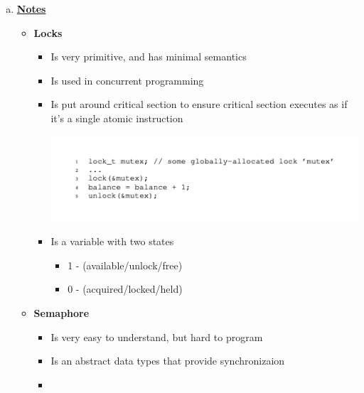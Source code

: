 \documentclass[12pt]{article}
\begin{document}
\begin{enumerate}[1.]
\begin{enumerate}[a)]
        \item

        \bigskip

        \underline{\textbf{Notes}}

        \begin{itemize}
            \item \textbf{Locks}

            \begin{itemize}
                \item Is very primitive, and has minimal semantics
                \item Is used in concurrent programming
                \item Is put around critical section to ensure critical section executes
                as if it's a single atomic instruction

                \begin{center}
                    \includegraphics[width=\linewidth]{images/midterm_1_solution_1.png}
                    \end{center}
                \item Is a variable with two states

                \begin{itemize}
                    \item 1 - (available/unlock/free)
                    \item 0 - (acquired/locked/held)
                \end{itemize}
            \end{itemize}

            \item \textbf{Semaphore}

            \begin{itemize}
                \item Is very easy to understand, but hard to program
                \item Is an abstract data types that provide synchronizaion
                \item
            \end{itemize}
        \end{itemize}
    \end{enumerate}
\end{enumerate}
\end{document}
